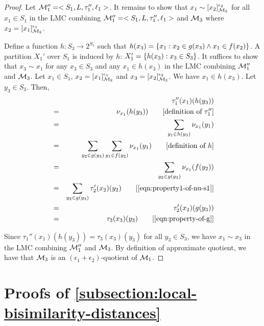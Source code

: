 \begin{proof}
	Let $\mathcal{M}_1'' = <S_1, L, \tau_1'', \ell_1>$. It remains to show that $x_1 \sim [x_2]^{\epsilon_2}_{\mathcal{M}_3}$ for all $x_1 \in S_1$ in the LMC combining $\mathcal{M}_1'' = <S_1, L, \tau_1'', \ell_1>$ and $\mathcal{M}_3$ where $x_2 = [x_1]^{\epsilon_1}_{\mathcal{M}_2}$. 
	
	
	Define a function $h: S_3 \to 2^{S_1}$ such that $h(x_3) = \{x_1 : x_2 \in g(x_3) \land x_1 \in f(x_2) \}$. A partition $X_1'$ over $S_1$ is induced by $h$: $X_1' = \{ h(x_3) : x_3 \in S_3 \}$. It suffices to show that $x_3 \sim x_1$ for any $x_3 \in S_3$ and any $x_1 \in h(x_3)$ in the LMC combining $\mathcal{M}_1''$ and $\mathcal{M}_3$. Let $x_1 \in S_1$,  $x_2 = [x_1]^{\epsilon_1}_{\mathcal{M}_2}$ and $x_3 = [x_2]^{\epsilon_2}_{\mathcal{M}_3}$. We have $x_1 \in h(x_3)$. Let $y_3 \in S_3$. Then,
	\begin{eqnarray*} 
		&&   \tau_1''(x_1)(h(y_3))  \\
		&=& \nu_{x_1}(h(y_3))  \commenteq{definition of $\tau_1''$}\\
		&=& \sum_{y_1 \in h(y_3)} \nu_{x_1}(y_1)  \\
		&=& \sum_{y_2 \in g(y_3)} \sum_{y_1 \in  f(y_2)} \nu_{x_1}(y_1) \commenteq{definition of $h$}\\
		&=& \sum_{y_2 \in g(y_3)} \nu_{x_1}(f(y_2)) \\
		&=& \sum_{y_2 \in g(y_3)} \tau_2'(x_2)(y_2)\commenteq{\cref{eqn:property1-of-nu-s1}}\\ 
		&=& \tau_2'(x_2)(g(y_3))\\ 
		&=& \tau_3(x_3)(y_3)\commenteq{\cref{eqn:property-of-g}} 				
	\end{eqnarray*}
	
	Since $\tau_1''(x_1)(h(y_3)) = \tau_3(x_3)(y_3) $ for all $y_3 \in S_3$, we have $x_1 \sim x_3$ in the LMC combining $\mathcal{M}_1''$ and $\mathcal{M}_3$. By definition of approximate quotient, we have that $\mathcal{M}_3$ is an $(\epsilon_1 + \epsilon_2)$-quotient of $\mathcal{M}_1$.
\end{proof}

\newpage
\section{Proofs of \cref{subsection:local-bisimilarity-distances}}\label{appendix:local-bisimilarity-distance}

